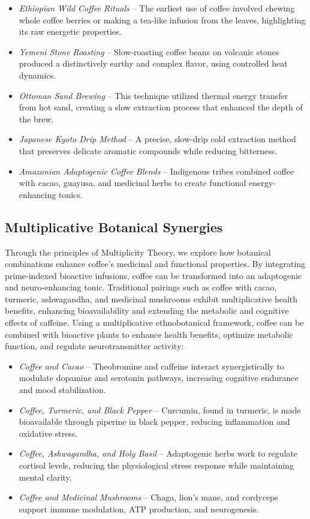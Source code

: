 \documentclass{article}
\theoremstyle{plain}
\theoremstyle{claimstyle}
\begin{document}
\begin{itemize}
    \item \textit{Ethiopian Wild Coffee Rituals} – The earliest use of coffee involved chewing whole coffee berries or making a tea-like infusion from the leaves, highlighting its raw energetic properties.
    \item \textit{Yemeni Stone Roasting} – Slow-roasting coffee beans on volcanic stones produced a distinctively earthy and complex flavor, using controlled heat dynamics.
    \item \textit{Ottoman Sand Brewing} – This technique utilized thermal energy transfer from hot sand, creating a slow extraction process that enhanced the depth of the brew.
    \item \textit{Japanese Kyoto Drip Method} – A precise, slow-drip cold extraction method that preserves delicate aromatic compounds while reducing bitterness.
    \item \textit{Amazonian Adaptogenic Coffee Blends} – Indigenous tribes combined coffee with cacao, guayusa, and medicinal herbs to create functional energy-enhancing tonics.
\end{itemize}

\subsection{Multiplicative Botanical Synergies}
Through the principles of Multiplicity Theory, we explore how botanical combinations enhance coffee’s medicinal and functional properties. By integrating prime-indexed bioactive infusions, coffee can be transformed into an adaptogenic and neuro-enhancing tonic. Traditional pairings such as coffee with cacao, turmeric, ashwagandha, and medicinal mushrooms exhibit multiplicative health benefits, enhancing bioavailability and extending the metabolic and cognitive effects of caffeine.
Using a multiplicative ethnobotanical framework, coffee can be combined with bioactive plants to enhance health benefits, optimize metabolic function, and regulate neurotransmitter activity:

\begin{itemize}
    \item \textit{Coffee and Cacao} – Theobromine and caffeine interact synergistically to modulate dopamine and serotonin pathways, increasing cognitive endurance and mood stabilization.
    \item \textit{Coffee, Turmeric, and Black Pepper} – Curcumin, found in turmeric, is made bioavailable through piperine in black pepper, reducing inflammation and oxidative stress.
    \item \textit{Coffee, Ashwagandha, and Holy Basil} – Adaptogenic herbs work to regulate cortisol levels, reducing the physiological stress response while maintaining mental clarity.
    \item \textit{Coffee and Medicinal Mushrooms} – Chaga, lion’s mane, and cordyceps support immune modulation, ATP production, and neurogenesis.
\end{itemize}
\end{document}
